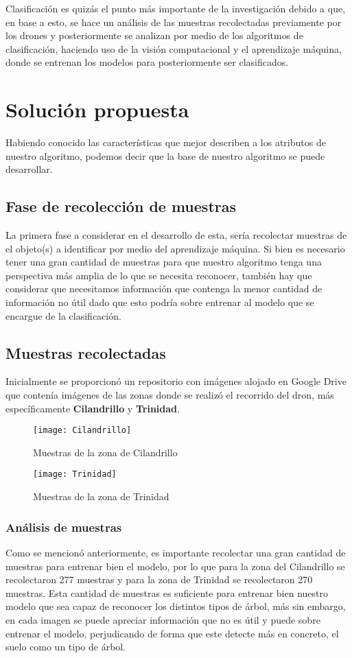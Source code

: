 Clasificación es quizás el punto más importante de la investigación debido a que, en base a esto, se hace un análisis de las muestras recolectadas previamente por los drones y posteriormente se analizan por medio de los algoritmos de clasificación, haciendo uso de la visión computacional y el aprendizaje máquina, donde se entrenan los modelos para posteriormente ser clasificados.


\chapter{Solución propuesta}
Habiendo conocido las características que mejor describen a los atributos de nuestro algoritmo, podemos decir que la base de nuestro algoritmo se puede desarrollar.

\section{Fase de recolección de muestras}
La primera fase a considerar en el desarrollo de esta, sería recolectar muestras de el objeto(s) a identificar por medio del aprendizaje máquina. Si bien es necesario tener una gran cantidad de muestras para que nuestro algoritmo tenga una perspectiva más amplia de lo que se necesita reconocer, también hay que considerar que necesitamos información que contenga la menor cantidad de información no útil dado que esto podría sobre entrenar al modelo que se encargue de la clasificación.

\section{Muestras recolectadas}
Inicialmente se proporcionó un repositorio con imágenes alojado en Google Drive que contenía imágenes de las zonas donde se realizó el recorrido del dron, más específicamente \textbf{Cilandrillo} y \textbf{Trinidad}.

\begin{figure}
 \centering
\texttt{[image: Cilandrillo]}
\caption{Muestras de la zona de Cilandrillo}
\end{figure}

\begin{figure}
 \centering
\texttt{[image: Trinidad]}
\caption{Muestras de la zona de Trinidad}
\end{figure}

\subsection{Análisis de muestras}
Como se mencionó anteriormente, es importante recolectar una gran cantidad de muestras para entrenar bien el modelo, por lo que para la zona del Cilandrillo se recolectaron 277 muestras y para la zona de Trinidad se recolectaron 270 muestras. Esta cantidad de muestras es suficiente para entrenar bien nuestro modelo que sea capaz de reconocer los distintos tipos de árbol, más sin embargo, en cada imagen se puede apreciar información que no es útil y puede sobre entrenar el modelo, perjudicando de forma que este detecte más en concreto, el suelo como un tipo de árbol.

